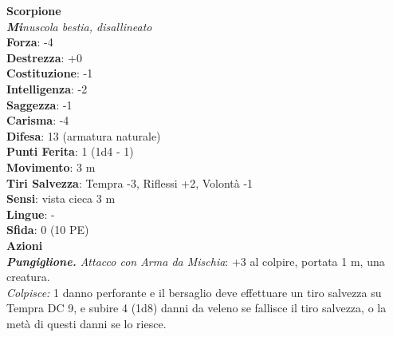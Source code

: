 \begin{multicols}{2}
\medskip\textbf{Scorpione}\\
\emph{\textbf{Mi}nuscola bestia, disallineato}\\
\textbf{Forza}: -4\\
\textbf{Destrezza}: +0\\
\textbf{Costituzione}: -1\\
\textbf{Intelligenza}: -2\\
\textbf{Saggezza}: -1\\
\textbf{Carisma}: -4\\
\textbf{Difesa}: 13 (armatura naturale)\\
\textbf{Punti Ferita}: 1 (1d4 - 1)\\
\textbf{Movimento}: 3 m\\
\textbf{Tiri Salvezza}: Tempra -3, Riflessi +2, Volontà -1\\
\textbf{Sensi}: vista cieca 3 m\\
\textbf{Lingue}: -\\
\textbf{Sfida}: 0 (10 PE)\smallskip\\
\smallskip\textbf{Azioni}\\
\emph{\textbf{Pungiglione.} Attacco con Arma da Mischia}: +3 al colpire, portata 1 m, una creatura.\\
\emph{Colpisce:} 1 danno perforante e il bersaglio deve effettuare un tiro salvezza su Tempra DC 9, e subire 4 (1d8) danni da veleno se fallisce il tiro salvezza, o la metà di questi danni se lo riesce.\\


\end{multicols}

